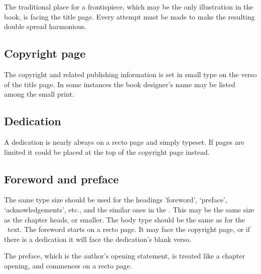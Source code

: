 \documentclass[10pt,a4paper,extrafontsizes]{memoir}
\begin{document}
\begin{paracol}{2}
\switchEng
    The traditional place for a frontispiece, 
which may be the only
illustration in the book, is facing the title page. Every attempt must be
made to make the resulting double spread harmonious.
\end{paracol}

\subsection{Copyright page}

\begin{paracol}{2}
\switchEng
    The copyright and related publishing 
information is set in small type
on the verso of the title page. In some instances the book designer's name may
be listed among the small print.
\end{paracol}

\subsection{Dedication}

\begin{paracol}{2}
\switchEng
    A dedication is nearly always on a recto page and 
simply typeset. If 
pages are limited it could be placed at the top of the copyright 
page instead.
\end{paracol}

\subsection{Foreword and preface}

\begin{paracol}{2}
\switchEng
    The same type size should be used for the headings 'foreword', `preface',
`acknowledgements', etc., and the similar ones in the \pixbackmatter. This
may be the same size as the chapter heads, or smaller. The body type should be
the same as for the \pixmainmatter\ text.
The foreword starts on a recto page. It may face the 
copyright page, or if 
there is a dedication it will face the dedication's 
blank verso.

    The preface, which is the author's opening statement, 
is treated like a chapter opening, and commences on a recto page.
\end{paracol}
\end{document}
